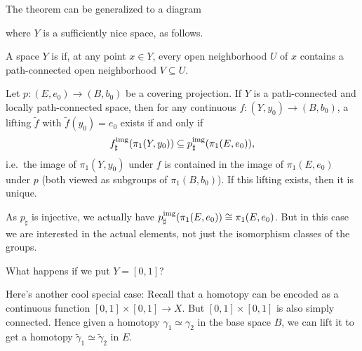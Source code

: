 The theorem can be generalized to a diagram
\begin{center}
\end{center}
where $Y$ is a sufficiently nice space, as follows.
\begin{definition}
	A space $Y$ is  if, at any point $x\in Y$,
	every open neighborhood $U$ of $x$ contains a path-connected open neighborhood
	$V\subseteq U$.
\end{definition}
\begin{theorem}
	\label{thm:lifting}
	Let $p \colon (E, e_0) \to (B, b_0)$ be a covering projection. If $Y$ is a
	path-connected and locally path-connected space, then for any continuous
	$f \colon (Y,y_0) \to (B, b_0)$, a lifting $\tilde f$ with $\tilde f(y_0) = e_0$
	exists if and only if
	\[ f_\sharp^{\text{img}}(\pi_1(Y, y_0)) \subseteq p_\sharp^{\text{img}}(\pi_1(E, e_0)), \]
	i.e.\ the image of $\pi_1(Y, y_0)$ under $f$ is contained in
	the image of $\pi_1(E, e_0)$ under $p$ (both viewed as subgroups of $\pi_1(B, b_0)$).
	If this lifting exists, then it is unique.
\end{theorem}
As $p_\sharp$ is injective,
we actually have $p_\sharp^{\text{img}}(\pi_1(E, e_0)) \cong \pi_1(E, e_0)$.
But in this case we are interested in the actual elements, not just the isomorphism classes of the groups.
\begin{ques}
	What happens if we put $Y=[0,1]$?
\end{ques}
\begin{remark}
	Here's another cool special case:
	Recall that a homotopy can be encoded as a continuous function $[0,1] \times [0,1] \to X$.
	But $[0,1] \times [0,1]$ is also simply connected.
	Hence given a homotopy $\gamma_1 \simeq \gamma_2$ in the base space $B$, we can lift it to get
	a homotopy $\tilde\gamma_1 \simeq \tilde\gamma_2$ in $E$.
\end{remark}
